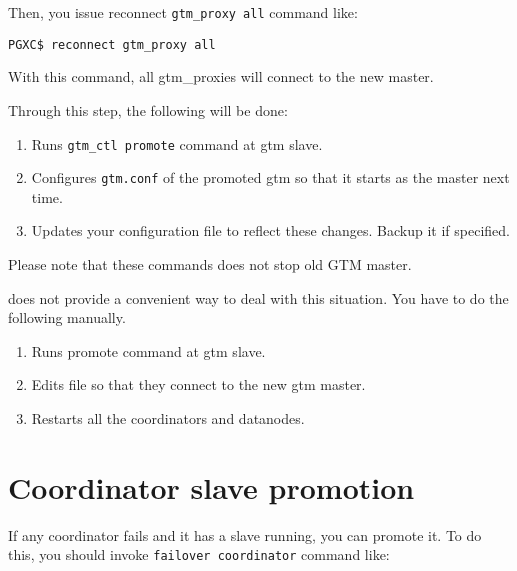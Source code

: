     Then, you issue reconnect \verb|gtm_proxy all| command like:
    
	\vspace{\parskip}
    \begin{lstlisting}[basicstyle=\ttfamily\normalsize,frame=single]
PGXC$ reconnect gtm_proxy all
    \end{lstlisting}
    
    With this command, all gtm\_proxies will connect to the new master.
    
    Through this step, the following will be done:
    
    \begin{enumerate}
		\item Runs \verb|gtm_ctl promote| command at gtm slave.
		\item Configures \verb|gtm.conf| of the promoted gtm so that it starts as the master
			  next time.
		\item Updates your configuration file to reflect these changes.   Backup it if specified.
    \end{enumerate}
    
    Please note that these commands does not stop old GTM master.
  
  
     does not provide a convenient way to deal with this situation.
    You have to do the following manually.
    
    \begin{enumerate}
  		\item Runs  promote command at gtm slave.
  		\item Edits  file so that they connect to the new gtm master.
  		\item Restarts all the coordinators and datanodes.
      \end{enumerate}
  
  
  
\section{\label{pgxcCtl:promoteCoordSlave}Coordinator slave promotion}
  
  If any coordinator fails and it has a slave running, you can promote it.
  To do this, you should invoke \texttt{failover coordinator} command like:
  
